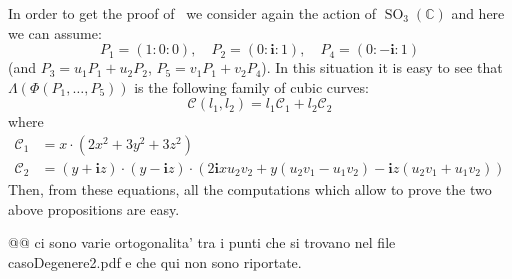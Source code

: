 \documentclass{amsart}
\theoremstyle{plain}
\theoremstyle{definition}
\newcommand{\C}{\mathbb{C}}
\newcommand{\SO}{\operatorname{SO}}
\newcommand{\iii}{\textbf{i}}
\begin{document}
In order to get the proof of~
we consider again the action of $\SO_3(\C)$ and here we can assume:
\[
P_1 = (1: 0: 0), \quad P_2 = (0: \iii: 1), \quad P_4 = (0: -\iii: 1)
\]
(and $P_3 = u_1P_1+u_2P_2$, $P_5 = v_1P_1+v_2P_4$). In this situation it
is easy to see that $\Lambda(\Phi(P_1, \dots, P_5))$
is the following family of cubic curves:
\[
\mathcal{C}(l_1, l_2) = l_1\mathcal{C}_1+l_2\mathcal{C}_2
\]
where
\begin{align*}
  \mathcal{C}_1 & = x \cdot \left(2x^{2} + 3 y^{2} + 3 z^{2}\right)\\
  \mathcal{C}_2 & = (y + \iii z) \cdot (y - \iii z)
\cdot \left(2 \iii x u_{2} v_{2} + y (u_{2} v_{1}- u_{1} v_{2})
- \iii z (u_{2} v_{1}  + u_{1} v_{2})\right)
\end{align*}
Then, from these equations, all the computations which allow to prove
the two above propositions are easy.

@@ ci sono varie ortogonalita' tra i punti che si trovano nel file
casoDegenere2.pdf e che qui non sono riportate.
\end{document}
